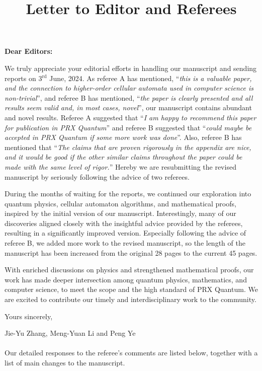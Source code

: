\documentclass{article}
\title{Letter to Editor and Referees}
\begin{document}
\maketitle
\noindent \textbf{Dear Editors:}

We truly appreciate your editorial efforts in handling our manuscript and sending reports on 3$^{\text{rd}}$ June, 2024. As referee A has mentioned, ``\textit{this is a valuable paper, and the
connection to higher-order cellular automata used in computer science is
non-trivial}'', and referee B has mentioned, ``\textit{the paper is clearly presented
and all results seem valid and, in most cases, novel}'', our manuscript contains abundant and novel results. Referee A suggested that ``\textit{I am happy to recommend this paper for publication in PRX Quantum}'' and referee B suggested that ``\textit{could
maybe be accepted in PRX Quantum if some more work was done}''.  Also, referee B has mentioned that ``\textit{The
claims that are proven rigorously in the appendix are nice, and it would
be good if the other similar claims throughout the paper could be made
with the same level of rigor.}'' Hereby we are resubmitting the revised manuscript by seriously following the advice of two referees.\bigskip

During the months of waiting for the reports, we continued our exploration into quantum physics, cellular automaton algorithms, and mathematical proofs, inspired by the initial version of our manuscript. Interestingly, many of our discoveries aligned closely with the insightful advice provided by the referees, resulting in a significantly improved version. Especially following the advice of referee B, we added more work to the revised manuscript, so the length of the manuscript has been increased from the original 28 pages to the current 45 pages. 
\bigskip 

With enriched discussions on physics and strengthened mathematical proofs, our work has made deeper intersection among quantum physics, mathematics, and computer science, to meet the scope and the high standard of PRX Quantum. We are excited to contribute our timely and interdisciplinary work to the community.


\hfill Yours sincerely,

\hfill Jie-Yu Zhang, Meng-Yuan Li and Peng Ye
\\\\
Our detailed responses to the referee’s comments are listed below, together with a list of main changes to the manuscript. 
\end{document}
